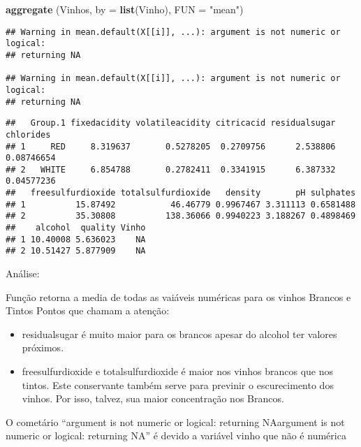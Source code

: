 \documentclass[]{article}
\newenvironment{Shaded}{\begin{snugshade}}{\end{snugshade}}
\newcommand{\KeywordTok}[1]{\textcolor[rgb]{0.13,0.29,0.53}{\textbf{#1}}}
\newcommand{\DataTypeTok}[1]{\textcolor[rgb]{0.13,0.29,0.53}{#1}}
\newcommand{\StringTok}[1]{\textcolor[rgb]{0.31,0.60,0.02}{#1}}
\newcommand{\CommentTok}[1]{\textcolor[rgb]{0.56,0.35,0.01}{\textit{#1}}}
\newcommand{\OperatorTok}[1]{\textcolor[rgb]{0.81,0.36,0.00}{\textbf{#1}}}
\newcommand{\NormalTok}[1]{#1}
\begin{document}
\begin{Shaded}
\begin{Highlighting}[]
\KeywordTok{aggregate}\NormalTok{ (Vinhos,}
           \DataTypeTok{by =} \KeywordTok{list}\NormalTok{(Vinho),}
           \DataTypeTok{FUN =}  \StringTok{"mean"}\NormalTok{)}
\end{Highlighting}
\end{Shaded}

\begin{verbatim}
## Warning in mean.default(X[[i]], ...): argument is not numeric or logical:
## returning NA

## Warning in mean.default(X[[i]], ...): argument is not numeric or logical:
## returning NA
\end{verbatim}

\begin{verbatim}
##   Group.1 fixedacidity volatileacidity citricacid residualsugar  chlorides
## 1     RED     8.319637       0.5278205  0.2709756      2.538806 0.08746654
## 2   WHITE     6.854788       0.2782411  0.3341915      6.387332 0.04577236
##   freesulfurdioxide totalsulfurdioxide   density       pH sulphates
## 1          15.87492           46.46779 0.9967467 3.311113 0.6581488
## 2          35.30808          138.36066 0.9940223 3.188267 0.4898469
##    alcohol  quality Vinho
## 1 10.40008 5.636023    NA
## 2 10.51427 5.877909    NA
\end{verbatim}

Análise:

Função retorna a media de todas as vaiáveis numéricas para os vinhos
Brancos e Tintos Pontos que chamam a atenção:

\begin{itemize}
\item
  residualsugar é muito maior para os brancos apesar do alcohol ter
  valores próximos.
\item
  freesulfurdioxide e totalsulfurdioxide é maior nos vinhos brancos que
  nos tintos. Este conservante também serve para previnir o
  escurecimento dos vinhos. Por isso, talvez, sua maior concentração nos
  Brancos.
\end{itemize}

O cometário ``argument is not numeric or logical: returning NAargument
is not numeric or logical: returning NA'' é devido a variável vinho que
não é numérica

\begin{Shaded}
\end{Shaded}
\end{document}
